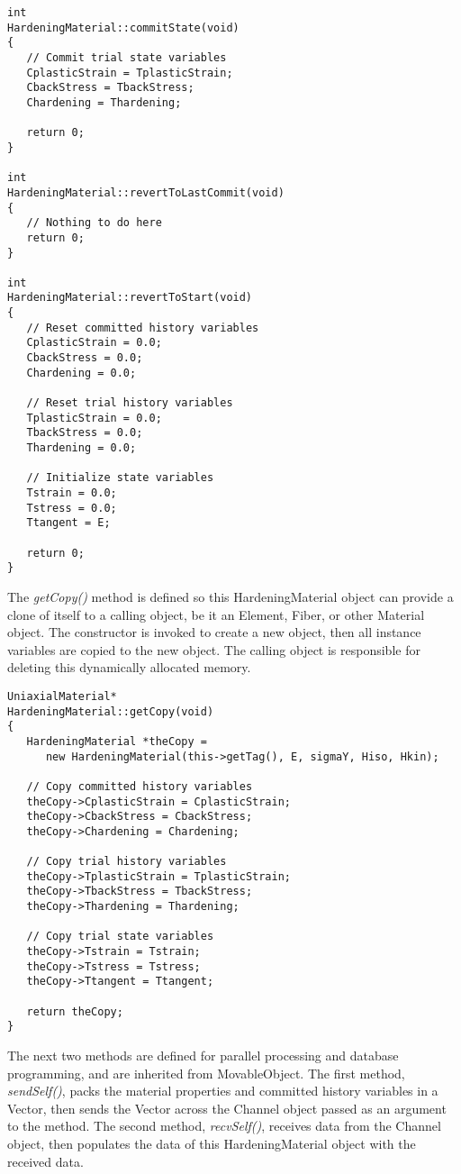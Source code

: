 \documentclass[12pt]{article}
\begin{document}
{\sf\small
\begin{verbatim}
int 
HardeningMaterial::commitState(void)
{
   // Commit trial state variables
   CplasticStrain = TplasticStrain;
   CbackStress = TbackStress;
   Chardening = Thardening;

   return 0;
}

int 
HardeningMaterial::revertToLastCommit(void)
{
   // Nothing to do here
   return 0;
}

int 
HardeningMaterial::revertToStart(void)
{
   // Reset committed history variables
   CplasticStrain = 0.0;
   CbackStress = 0.0;
   Chardening = 0.0;

   // Reset trial history variables
   TplasticStrain = 0.0;
   TbackStress = 0.0;
   Thardening = 0.0;

   // Initialize state variables
   Tstrain = 0.0;
   Tstress = 0.0;
   Ttangent = E;

   return 0;
}
\end{verbatim}
}

\noindent The {\em getCopy()} method is defined so this HardeningMaterial object can
provide a clone of itself to a calling object, be it an Element, Fiber, or other
Material object. The constructor is invoked to create a new object, then all
instance variables are copied to the new object. The calling object is responsible
for deleting this dynamically allocated memory.

{\sf\small
\begin{verbatim}
UniaxialMaterial*
HardeningMaterial::getCopy(void)
{
   HardeningMaterial *theCopy = 
      new HardeningMaterial(this->getTag(), E, sigmaY, Hiso, Hkin);

   // Copy committed history variables
   theCopy->CplasticStrain = CplasticStrain;
   theCopy->CbackStress = CbackStress;
   theCopy->Chardening = Chardening;

   // Copy trial history variables
   theCopy->TplasticStrain = TplasticStrain;
   theCopy->TbackStress = TbackStress;
   theCopy->Thardening = Thardening;

   // Copy trial state variables
   theCopy->Tstrain = Tstrain;
   theCopy->Tstress = Tstress;
   theCopy->Ttangent = Ttangent;
    
   return theCopy;
}
\end{verbatim}
}

\noindent The next two methods are defined for parallel processing and database programming,
and are inherited from MovableObject.
The first method, {\em sendSelf()}, packs the material properties and committed history variables
in a Vector, then sends the Vector across the Channel object passed as an argument to the
method. The second method, {\em recvSelf()}, receives data from the Channel object, then populates
the data of this HardeningMaterial object with the received data.
\end{document}
